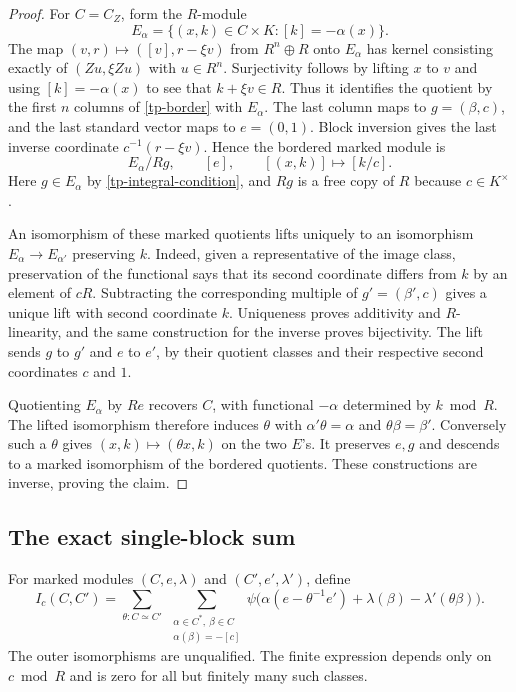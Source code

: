\begin{proof}
For $C=C_Z$, form the $R$-module
\[
 E_\alpha=\{(x,k)\in C\times K:[k]=-\alpha(x)\}.
\]
The map $(v,r)\mapsto([v],r-\xi v)$ from $R^n\oplus R$
onto $E_\alpha$ has kernel consisting exactly of
$(Zu,\xi Zu)$ with $u\in R^n$. Surjectivity follows by lifting
$x$ to $v$ and using $[k]=-\alpha(x)$ to see that $k+\xi v\in R$.
Thus it identifies the quotient by the first $n$ columns of
\eqref{tp-border} with $E_\alpha$. The last column maps to
$g=(\beta,c)$, and the last standard vector maps to $e=(0,1)$.
Block inversion gives the last inverse coordinate
$c^{-1}(r-\xi v)$. Hence the bordered marked module is
\[
 E_\alpha/Rg,\qquad [e],\qquad [(x,k)]\longmapsto[k/c].
\]
Here $g\in E_\alpha$ by \eqref{tp-integral-condition}, and
$Rg$ is a free copy of $R$ because $c\in K^\times$.

An isomorphism of these marked quotients lifts uniquely to an
isomorphism $E_\alpha\to E_{\alpha'}$ preserving $k$. Indeed,
given a representative of the image class, preservation of the
functional says that its second coordinate differs from $k$ by
an element of $cR$. Subtracting the corresponding multiple of
$g'=(\beta',c)$ gives a unique lift with second coordinate $k$.
Uniqueness proves additivity and $R$-linearity, and the same
construction for the inverse proves bijectivity. The lift sends
$g$ to $g'$ and $e$ to $e'$, by their quotient classes and their
respective second coordinates $c$ and $1$.

Quotienting $E_\alpha$ by $Re$ recovers $C$, with functional
$-\alpha$ determined by $k\bmod R$. The lifted isomorphism
therefore induces $\theta$ with $\alpha'\theta=\alpha$ and
$\theta\beta=\beta'$. Conversely such a $\theta$ gives
$(x,k)\mapsto(\theta x,k)$ on the two $E$'s. It preserves
$e,g$ and descends to a marked isomorphism of the bordered
quotients. These constructions are inverse, proving the claim.
\end{proof}

\subsection{The exact single-block sum}

For marked modules $(C,e,\lambda)$ and $(C',e',\lambda')$,
define
\begin{equation}\label{tp-finite-inner}
 I_c(C,C')=
 \sum_{\theta:C\simeq C'}\ 
 \sum_{\substack{\alpha\in C^*,\ \beta\in C\\
                         \alpha(\beta)=-[c]}}
 \psi\bigl(\alpha(e-\theta^{-1}e')
                    +\lambda(\beta)-\lambda'(\theta\beta)\bigr).
\end{equation}
The outer isomorphisms are unqualified. The finite expression
depends only on $c\bmod R$ and is zero for all but finitely many
such classes.

